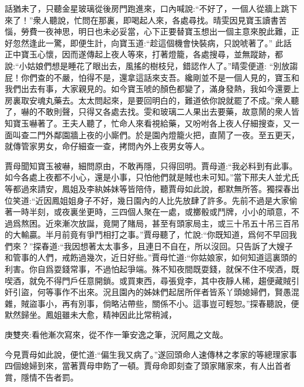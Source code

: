 \begin{parag}
    話猶未了，只聽金星玻璃從後房門跑進來，口內喊說:“不好了，一個人從牆上跳下來了！”衆人聽說，忙問在那裏，即喝起人來，各處尋找。晴雯因見寶玉讀書苦惱，勞費一夜神思，明日也未必妥當，心下正要替寶玉想出一個主意來脫此難，正好忽然逢此一驚，即便生計，向寶玉道:“趁這個機會快裝病，只說唬著了。” 此話正中寶玉心懷，因而遂傳起上夜人等來，打著燈籠，各處搜尋，並無蹤跡，都說:“小姑娘們想是睡花了眼出去，風搖的樹枝兒，錯認作人了。”晴雯便道: “別放謅屁！你們查的不嚴，怕得不是，還拿這話來支吾。纔剛並不是一個人見的，寶玉和我們出去有事，大家親見的。如今寶玉唬的顏色都變了，滿身發熱，我如今還要上房裏取安魂丸藥去。太太問起來，是要回明白的，難道依你說就罷了不成。”衆人聽了，嚇的不敢則聲，只得又各處去找。雯和玻璃二人果出去要藥，故意鬧的衆人皆知寶玉嚇著了。王夫人聽了，忙命人來看視給藥，又吩咐各上夜人仔細搜查，又一面叫查二門外鄰園牆上夜的小廝們。於是園內燈籠火把，直鬧了一夜。至五更天，就傳管家男女，命仔細查一查，拷問內外上夜男女等人。
\end{parag}


\begin{parag}
    賈母聞知寶玉被嚇，細問原由，不敢再隱，只得回明。賈母道:“我必料到有此事。如今各處上夜都不小心，還是小事，只怕他們就是賊也未可知。”當下邢夫人並尤氏等都過來請安，鳳姐及李紈姊妹等皆陪侍，聽賈母如此說，都默無所答。獨探春出位笑道:“近因鳳姐姐身子不好，幾日園內的人比先放肆了許多。先前不過是大家偷著一時半刻，或夜裏坐更時，三四個人聚在一處，或擲骰或鬥牌，小小的頑意，不過爲熬困。近來漸次放誕，竟開了賭局，甚至有頭家局主，或三十吊五十吊三百吊的大輸贏。半月前竟有爭鬥相打之事。”賈母聽了，忙說:“你既知道，爲何不早回我們來？”探春道:“我因想著太太事多，且連日不自在，所以沒回。只告訴了大嫂子和管事的人們，戒飭過幾次，近日好些。”賈母忙道:“你姑娘家，如何知道這裏頭的利害。你自爲耍錢常事，不過怕起爭端。殊不知夜間既耍錢，就保不住不喫酒，既喫酒，就免不得門戶任意開鎖。或買東西，尋張覓李，其中夜靜人稀，趨便藏賊引奸引盜，何等事作不出來。況且園內的姊妹們起居所伴者皆系丫頭媳婦們，賢愚混雜，賊盜事小，再有別事，倘略沾帶些，關係不小。這事豈可輕恕。”探春聽說，便默然歸坐。鳳姐雖未大愈，精神因此比常稍減，\begin{note}庚雙夾:看他漸次寫來，從不作一筆安逸之筆，況阿鳳之文哉。\end{note}今見賈母如此說，便忙道:“偏生我又病了。”遂回頭命人速傳林之孝家的等總理家事四個媳婦到來，當著賈母申飭了一頓。賈母命即刻查了頭家賭家來，有人出首者賞，隱情不告者罰。
\end{parag}


